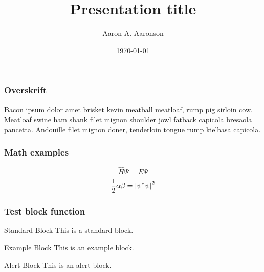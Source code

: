 \documentclass[aspectratio=43,xcolor={rgb}]{beamer}
\title{Presentation title}
\date{\today}
\author{Aaron A. Aaronson}
\begin{document}
\setcounter{page}{1}
\begin{frame}
  \titlepage
\end{frame}

\setcounter{page}{2}
\begin{frame}
  \titlepage
\end{frame}

\setcounter{page}{3}
\setcounter{framenumber}{0} %
\begin{frame}
  \frametitle{Overskrift}
  Bacon ipsum dolor amet brisket kevin meatball meatloaf, rump pig
  sirloin cow. Meatloaf swine ham shank filet mignon shoulder jowl
  fatback capicola bresaola pancetta. Andouille filet mignon doner,
  tenderloin tongue rump kielbasa capicola.
\end{frame}

\begin{frame}
  \frametitle{Math examples}
  \begin{equation}
    \hat{H}\Psi = E\Psi
  \end{equation}
  \begin{equation}
    \frac{1}{2}\alpha\beta = \qty|\psi^*\psi|^2
  \end{equation}
\end{frame}

\begin{frame}
  \frametitle{Test block function}
  \begin{block}{Standard Block}
    This is a standard block.
  \end{block}
  
  \begin{exampleblock}{Example Block}
    This is an example block.
  \end{exampleblock}
  
  \begin{alertblock}{Alert Block}
    This is an alert block.
  \end{alertblock}
\end{frame}

\begin{frame}
\end{frame}
\end{document}
